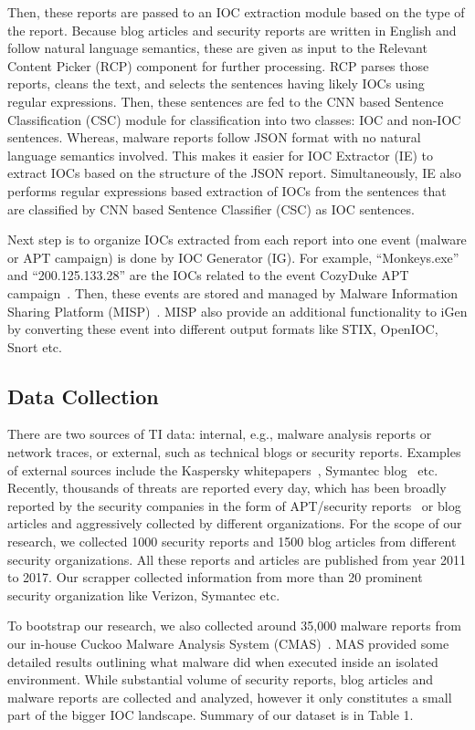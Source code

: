  Then, these reports are passed to an IOC extraction module based on the type of the report. Because blog articles and security reports are written in English and follow natural language semantics, these are given as input to the Relevant Content Picker (RCP) component for further processing. RCP parses those reports, cleans the text, and selects the sentences having likely IOCs using regular expressions. Then, these sentences are fed to the CNN based Sentence Classification (CSC) module for classification into two classes: IOC and non-IOC sentences.  Whereas, malware reports follow JSON format with no natural language semantics involved. This makes it easier for IOC Extractor (IE) to extract IOCs based on the structure of the JSON report. Simultaneously, IE also performs regular expressions based extraction of IOCs from the sentences that are classified by CNN based Sentence Classifier (CSC) as IOC sentences.    

Next step is to organize IOCs extracted from each report into one event (malware or APT campaign) is done by IOC Generator (IG). For example, “Monkeys.exe” and “200.125.133.28” are the IOCs related to the event CozyDuke APT campaign~\cite{cozyduke}. Then, these events are stored and managed by Malware Information Sharing Platform (MISP)~\cite{misp}. MISP also provide an additional functionality to iGen by converting these event into different output formats like STIX, OpenIOC, Snort etc. 
    
\subsection{Data Collection}
There are two sources of TI data: internal, e.g., malware analysis reports or network traces, or external, such as technical blogs or security reports. Examples of external sources include the Kaspersky whitepapers~\cite{kaspersky}, Symantec blog~\cite{symantecblog} etc. Recently, thousands of threats are reported every day, which has been broadly reported by the security companies in the form of APT/security reports~\cite{daly} or blog articles and aggressively collected by different organizations. For the scope of our research, we collected 1000 security reports and 1500 blog articles from different security organizations. All these reports and articles are published from year 2011 to 2017. Our scrapper collected information from more than 20 prominent security organization like Verizon, Symantec etc.

To bootstrap our research, we also collected around 35,000 malware reports from our in-house Cuckoo Malware Analysis System (CMAS)~\cite{oktavianto}. MAS provided some detailed results outlining what malware did when executed inside an isolated environment. While substantial volume of security reports, blog articles and malware reports are collected and analyzed, however it only constitutes a small part of the bigger IOC landscape. Summary of our dataset is in Table 1.  

